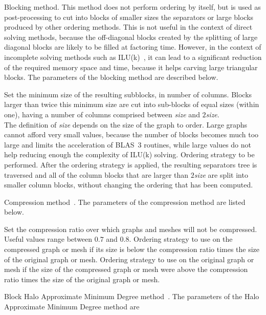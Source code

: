 \begin{itemize}
\iteme[{\tt b}]
Blocking method. This method does not perform ordering by itself, but
is used as post-processing to cut into blocks of smaller sizes the
separators or large blocks produced by other ordering methods. This is
not useful in the context of direct solving methods, because the
off-diagonal blocks created by the splitting of large diagonal blocks
are likely to be filled at factoring time. However, in the context of
incomplete solving methods such as ILU(k)~\cite{heperaro04a}, it can
lead to a significant reduction of the required memory space and time,
because it helps carving large triangular blocks.
The parameters of the blocking method are described below.
\begin{itemize}
\iteme[{\tt cmin=}{\it size}]
Set the minimum size of the resulting subblocks, in number of columns.
Blocks larger than twice this minimum size are cut into sub-blocks of
equal sizes (within one), having a number of columns comprised between
{\it size} and $2${\it size}.
\\
The definition of {\it size} depends on the size of the graph
to order. Large graphs cannot afford very small values, because the
number of blocks becomes much too large and limits the acceleration
of BLAS~3 routines, while large values do not help reducing enough
the complexity of ILU(k) solving.
\iteme[{\tt strat=}{\it strat}]
Ordering strategy to be performed. After the ordering strategy is
applied, the resulting separators tree is traversed and all of the
column blocks that are larger than $2${\it size} are split into
smaller column blocks, without changing the ordering that has been
computed.
\end{itemize}
\iteme[{\tt c}]
Compression method~\cite{ashc95}.
The parameters of the compression method are listed below.
\begin{itemize}
\iteme[{\tt rat=}{\it rat}]
Set the compression ratio over which graphs and meshes will not be
compressed. Useful values range between $0.7$ and $0.8$.
\iteme[{\tt cpr=}{\it strat}]
Ordering strategy to use on the compressed graph or mesh if its size
is below the compression ratio times the size of the original graph
or mesh.
\iteme[{\tt unc=}{\it strat}]
Ordering strategy to use on the original graph or mesh if the size of
the compressed graph or mesh were above the compression ratio times
the size of the original graph or mesh.
\end{itemize}
\iteme[{\tt d}]
Block Halo Approximate Minimum Degree method~\cite{peroam99}.
The parameters of the Halo Approximate Minimum Degree method are

\end{itemize}
